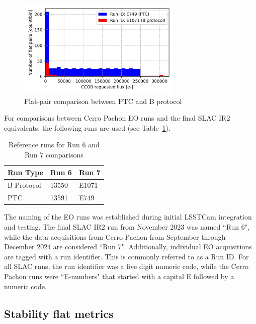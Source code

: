 \begin{figure}[H]
\begin{centering}
\includegraphics[width=0.7\textwidth]{figures/baselineCharacterization/PTC_BProtocol_Comparison.jpg}
	\caption{Flat-pair comparison between PTC and B protocol
\label{fig:PTC_BProtocol_Comparison}}
\end{centering}
\end{figure}

For comparisons between Cerro Pachon EO runs and the final SLAC IR2 equivalents, the following runs are used (see Table~\ref{runTable-b-ptc}).

\begin{table}[h]
\centering
\caption{Reference runs for Run 6 and Run 7 comparisons} \label{runTable-b-ptc}
\begin{tabular}{lll}
\toprule
Run Type & Run 6 & Run 7 \\
\midrule
B Protocol & 13550 & E1071 \\
PTC        & 13591 & E749 \\
\bottomrule
\end{tabular}
\end{table}

The naming of the EO runs was established during initial LSSTCam
integration and testing. The final SLAC IR2 run from November 2023 was
named ``Run 6", while the data acquisitions from Cerro Pachon from September through December 2024 are considered ``Run 7". Additionally, individual EO acquisitions are tagged with a run identifier. This is commonly referred to as a Run ID. For all SLAC runs, the run identifier was a five digit numeric code, while the Cerro Pachon runs were ``E-numbers" that started with a capital E followed by a numeric code.


\subsection{Stability flat metrics}\label{stability-flat-metrics}

